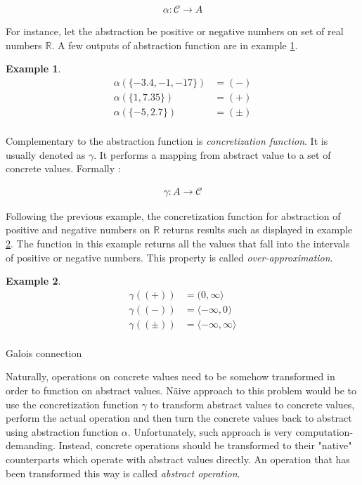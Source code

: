 \documentclass[12pt,final,oneside]{fithesis2}
\theoremstyle{definition}
\newtheorem{example}{Example}
\begin{document}
\begin{align*}
\alpha : \mathcal{C} \to A
\end{align*}

For instance, let the abstraction be positive or negative numbers on set of
real numbers $\mathbb{R}$. A few outputs of abstraction function are in example
\ref{ex:abstractionfunc}.

\begin{example}
\label{ex:abstractionfunc}
\begin{align*}
\alpha(\{ -3.4, -1, -17 \}) &= (-) \\
\alpha(\{ 1, 7.35 \}) &= (+) \\
\alpha(\{ -5, 2.7 \}) &= (\pm) \\
\end{align*}
\end{example}

Complementary to the abstraction function is \textit{concretization
function}. It is usually denoted as $\gamma$. It performs a mapping from
abstract value to a set of concrete values. Formally \cite{CousotCousot76-1}:

\begin{align*}
\gamma : A \to \mathcal{C}
\end{align*}

Following the previous example, the concretization function for abstraction
of positive and negative numbers on $\mathbb{R}$ returns results such as displayed
in example \ref{ex:concretizationfunc}. The function in this example returns all
the values that fall into the intervals of positive or negative numbers. This property
is called \textit{over-approximation}.

\begin{example}
\label{ex:concretizationfunc}
\begin{align*}
\gamma((+)) &= (0, \infty \rangle \\
\gamma((-)) &= \langle -\infty, 0) \\
\gamma((\pm)) &= \langle -\infty, \infty \rangle \\
\end{align*}
\end{example}

Galois connection

Naturally, operations on concrete values need to be somehow transformed
in order to function on abstract values. N\"{a}ive approach to this problem
would be to use the concretization function $\gamma$ to transform abstract values
to concrete values, perform the actual operation and then turn the concrete values
back to abstract using abstraction function $\alpha$. Unfortunately, such approach
is very computation-demanding. Instead, concrete operations should be transformed to their
"native" counterparts which operate with abstract values directly. An operation that
has been transformed this way is called \textit{abstract operation}.
\end{document}
